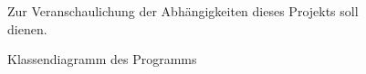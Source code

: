 
\begin{figure}[ht!]
\vspace{0.25cm}
\begin{center}
\caption{Klassendiagramm des Programms}
\label{fig:PackDep}
\end{center}

\vspace{0.25cm}
Zur Veranschaulichung der Abhängigkeiten dieses Projekts soll  dienen.
\end{figure}
